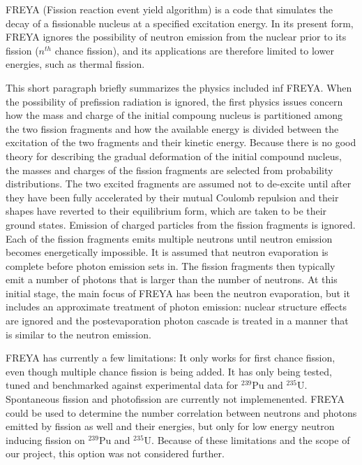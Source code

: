 FREYA (Fission reaction event yield algorithm) is a code that simulates the decay of a fissionable nucleus at a specified excitation energy. In its present form, FREYA ignores the possibility of neutron emission from the nuclear prior to its fission ($n^{th}$ chance fission), and its applications are therefore limited to lower energies, such as thermal fission. 

This short paragraph briefly summarizes the physics included inf FREYA. When the possibility of prefission radiation is ignored, the first physics issues concern how the mass and charge of the initial compoung nucleus is partitioned among the two fission fragments and how the available energy is divided between the excitation of the two fragments and their kinetic energy. Because there is no good theory for describing the gradual deformation of the initial compound nucleus, the masses and charges of the fission fragments are selected from probability distributions. The two excited fragments are assumed not to de-excite until after they have been fully accelerated by their mutual Coulomb repulsion and their shapes have reverted to their equilibrium form, which are taken to be their ground states. Emission of charged particles from the fission fragments is ignored. Each of the fission fragments emits multiple neutrons until neutron emission becomes energetically impossible. It is assumed that neutron evaporation is complete before photon emission sets in. The fission fragments then typically emit a number of photons that is larger than the number of neutrons. At this initial stage, the main focus of FREYA has been the neutron evaporation, but it includes an approximate treatment of photon emission: nuclear structure effects are ignored and the postevaporation photon cascade is treated in a manner that is similar to the neutron emission. 

FREYA has currently a few limitations: It only works for first chance fission, even though multiple chance fission is being added. It has only being tested, tuned and benchmarked against experimental data for $^{239}$Pu and $^{235}$U. Spontaneous fission and photofission are currently not implemenented. FREYA could be used to determine the number correlation between neutrons and photons emitted by fission as well and their energies, but only for low energy neutron inducing fission on $^{239}$Pu and $^{235}$U. Because of these limitations and the scope of our project, this option was not considered further.
